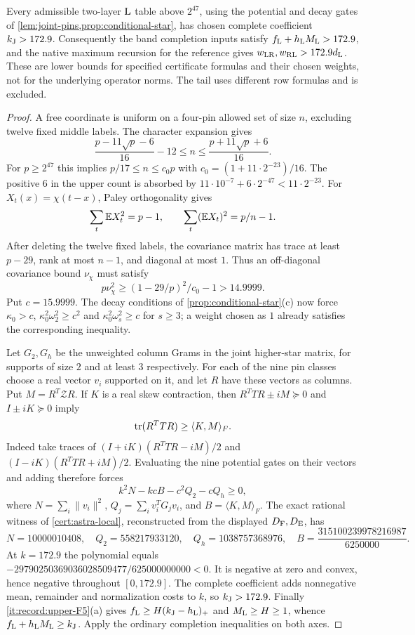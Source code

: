 \begin{proposition}
\label{prop:joint-row-floor}
Every admissible two-layer $\rm L$ table above $2^{47}$, using the
potential and decay gates of \cref{lem:joint-pins,prop:conditional-star},
has chosen complete coefficient $k_{\rm J}>172.9$.
Consequently the band completion inputs satisfy
$f_{\rm L}+h_{\rm L}M_{\rm L}>172.9$, and the native maximum
recursion for the reference gives
$w_{\rm LR},w_{\rm RL}>172.9d_{\rm L}$.
These are lower bounds for specified certificate formulas and their
chosen weights, not for the underlying operator norms. The tail
uses different row formulas and is excluded.
\end{proposition}
\begin{proof}
A free coordinate is uniform on a four-pin allowed set of size $n$,
excluding twelve fixed middle labels. The character expansion gives
\[
 \frac{p-11\sqrt p-6}{16}-12\le n\le
 \frac{p+11\sqrt p+6}{16}.
\]
For $p\ge2^{47}$ this implies $p/17\le n\le c_0p$ with
$c_0=(1+11\cdot2^{-23})/16$. The positive $6$ in the upper count
is absorbed by
$11\cdot10^{-7}+6\cdot2^{-47}<11\cdot2^{-23}$.
For $X_t(x)=\chi(t-x)$, Paley orthogonality gives
\[
 \sum_t\mathbb E X_t^2=p-1,\qquad
 \sum_t(\mathbb E X_t)^2=p/n-1.
\]
After deleting the twelve fixed labels, the covariance matrix has
trace at least $p-29$, rank at most $n-1$, and diagonal at most $1$.
Thus an off-diagonal covariance bound $\nu_\chi$ must satisfy
\[
 p\nu_\chi^2\ge(1-29/p)^2/c_0-1>14.9999.
\]
Put $c=15.9999$. The decay conditions of
\cref{prop:conditional-star}(c) now force
$\kappa_0>c$, $\kappa_0^2\omega_2^2\ge c^2$ and
$\kappa_0^2\omega_s^2\ge c$ for $s\ge3$; a weight chosen as $1$
already satisfies the corresponding inequality.

Let $G_2,G_h$ be the unweighted column Grams in the joint higher-star
matrix, for supports of size $2$ and at least $3$ respectively.
For each of the nine pin classes choose a real vector $v_i$ supported
on it, and let $R$ have these vectors as columns. Put
$M=R^T\mathcal ZR$. If $K$ is a real skew contraction, then
$R^TTR\pm iM\succeq0$ and $I\pm iK\succeq0$ imply
\[
 \operatorname{tr}(R^TTR)\ge\langle K,M\rangle_F.
\]
Indeed take traces of
$(I+iK)(R^TTR-iM)/2$ and $(I-iK)(R^TTR+iM)/2$.
Evaluating the nine potential gates on their vectors and adding
therefore forces
\[
 k^2N-kcB-c^2Q_2-cQ_h\ge0,
\]
where $N=\sum_i\|v_i\|^2$, $Q_j=\sum_i v_i^TG_jv_i$,
and $B=\langle K,M\rangle_F$. The exact rational witness of
\cref{cert:astra-local}, reconstructed from the displayed
$D_{\rm F},D_{\rm E}$, has
\[
 N=10000010408,\quad Q_2=558217933120,\quad Q_h=1038757368976,
 \quad B=\frac{315100239978216987}{6250000}.
\]
At $k=172.9$ the polynomial equals
$-29790250369036028509477/625000000000<0$.
It is negative at zero and convex, hence negative throughout
$[0,172.9]$. The complete coefficient adds nonnegative mean,
remainder and normalization costs to $k$, so $k_{\rm J}>172.9$.
Finally \ref{it:record:upper-F5}(a) gives
$f_{\rm L}\ge H(k_{\rm J}-h_{\rm L})_+$ and
$M_{\rm L}\ge H\ge1$, whence
$f_{\rm L}+h_{\rm L}M_{\rm L}\ge k_{\rm J}$.
Apply the ordinary completion inequalities on both axes.
\end{proof}

